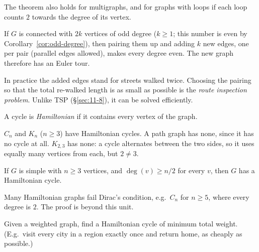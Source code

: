 \begin{note}[Multigraphs]
The theorem also holds for multigraphs, and for graphs with loops if each loop counts $2$ towards the degree of its vertex.
\end{note}

\bigskip
\begin{theorem}
If $G$ is connected with $2k$ vertices of odd degree ($k\ge1$; this number is even by Corollary~\ref{cor:odd-degree}), then pairing them up and adding $k$ new edges, one per pair (parallel edges allowed), makes every degree even. The new graph therefore has an Euler tour.
\end{theorem}

\begin{note}
In practice the added edges stand for streets walked twice. Choosing the pairing so that the total re-walked length is as small as possible is the \emph{route inspection problem}. Unlike TSP (\S\ref{sec:11-8}), it can be solved efficiently.
\end{note}

\bigskip
\begin{definition}
\label{def:hamiltonian}
A cycle is \emph{Hamiltonian} if it contains every vertex of the graph.
\end{definition}

\begin{example}
$C_n$ and $K_n$ ($n\ge3$) have Hamiltonian cycles. A path graph has none, since it has no cycle at all. $K_{2,3}$ has none: a cycle alternates between the two sides, so it uses equally many vertices from each, but $2\ne3$.
\end{example}

\begin{theorem}
If $G$ is simple with $n\ge3$ vertices, and $\deg(v)\ge n/2$ for every $v$, then $G$ has a Hamiltonian cycle.
\end{theorem}

\begin{note}
Many Hamiltonian graphs fail Dirac's condition, e.g.\ $C_n$ for $n\ge5$, where every degree is $2$. The proof is beyond this unit.
\end{note}

\begin{definition}
Given a weighted graph, find a Hamiltonian cycle of minimum total weight. (E.g.\ visit every city in a region exactly once and return home, as cheaply as possible.)
\end{definition}

